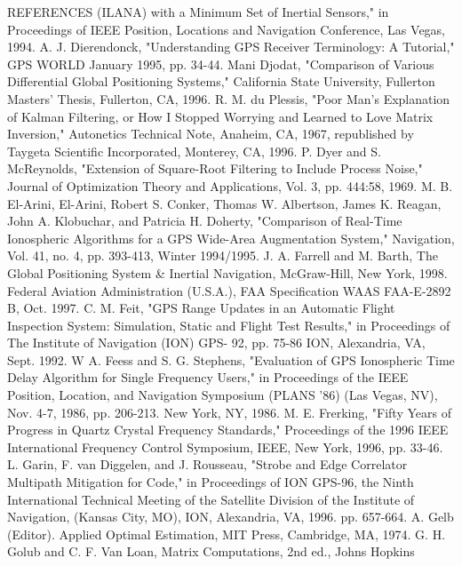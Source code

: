 \begin{thebibliography}{99}
 REFERENCES
(ILANA) with a Minimum Set of Inertial Sensors," in Proceedings of IEEE Position, Locations and Navigation Conference, Las Vegas, 1994.
 A. J. Dierendonck,  "Understanding GPS Receiver Terminology: A Tutorial,"  GPS
WORLD January 1995, pp. 34-44.
 Mani  Djodat,   "Comparison of Various  Differential  Global  Positioning  Systems,"
California State University, Fullerton Masters' Thesis, Fullerton, CA, 1996.
 R. M. du Plessis, "Poor Man's Explanation of Kalman Filtering, or How I Stopped
Worrying and Learned to Love Matrix Inversion," Autonetics Technical Note, Anaheim,
CA, 1967, republished by Taygeta Scientific Incorporated, Monterey, CA, 1996.
 P. Dyer and S. McReynolds, "Extension of Square-Root Filtering to Include Process
Noise,"  Journal of Optimization  Theory and Applications, Vol.  3,  pp.  444:58,
1969.
 M. B. El-Arini, El-Arini, Robert S. Conker, Thomas W. Albertson, James K. Reagan,
John A. Klobuchar, and Patricia H. Doherty, "Comparison of Real-Time Ionospheric
Algorithms for a GPS Wide-Area Augmentation System," Navigation, Vol. 41, no. 4, pp.
393-413, Winter 1994/1995.
 J. A. Farrell and M. Barth, The Global Positioning System \& Inertial Navigation,
McGraw-Hill, New York, 1998.
 Federal Aviation Administration (U.S.A.), FAA Specification WAAS FAA-E-2892 B, Oct.
1997.
 C. M. Feit, "GPS Range Updates in an Automatic Flight Inspection System: Simulation,
Static and Flight Test Results," in Proceedings of The Institute of Navigation (ION) GPS-
92, pp. 75-86 ION, Alexandria, VA, Sept. 1992.
 W A. Feess and S. G. Stephens, "Evaluation of GPS Ionospheric Time Delay Algorithm
for Single Frequency Users," in Proceedings of the IEEE Position, Location, and
Navigation Symposium (PLANS '86) (Las Vegas, NV), Nov. 4-7, 1986, pp. 206-213.
New York, NY, 1986.
 M. E. Frerking, "Fifty Years of Progress in Quartz Crystal Frequency Standards,"
Proceedings of the 1996 IEEE International Frequency Control Symposium, IEEE,
New York, 1996, pp. 33-46.
 L. Garin, F. van Diggelen, and J. Rousseau, "Strobe and Edge Correlator Multipath
Mitigation for Code," in Proceedings of ION GPS-96, the Ninth International Technical
Meeting of the Satellite Division of the Institute of Navigation, (Kansas City, MO), ION,
Alexandria, VA, 1996. pp. 657-664.
 A. Gelb (Editor). Applied Optimal Estimation, MIT Press, Cambridge, MA, 1974.
 G. H. Golub and C. F. Van Loan, Matrix Computations, 2nd ed., Johns Hopkins

\end{thebibliography}
